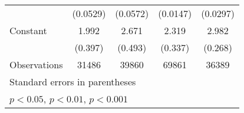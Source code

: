{\begin{tabular*}{\textwidth}{@{\hskip\tabcolsep\extracolsep\fill}l*{4}{c}}
                    &    (0.0529)         &    (0.0572)         &    (0.0147)         &    (0.0297)         \\
\addlinespace
Constant            &       1.992\sym{**} &       2.671\sym{***}&       2.319\sym{***}&       2.982\sym{***}\\
                    &     (0.397)         &     (0.493)         &     (0.337)         &     (0.268)         \\
\midrule
Observations        &       31486         &       39860         &       69861         &       36389         \\
\bottomrule
\multicolumn{5}{l}{\footnotesize Standard errors in parentheses}\\
\multicolumn{5}{l}{\footnotesize \sym{*} \(p<0.05\), \sym{**} \(p<0.01\), \sym{***} \(p<0.001\)}\\
\end{tabular*}
}
